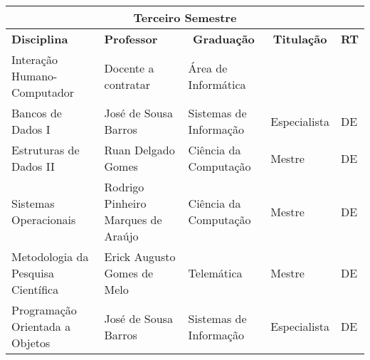 \begin{table}[h!]
\scriptsize
\begin{tabular}{lllll}
\multicolumn{5}{c}{\cellcolor[HTML]{C0C0C0}\textbf{Terceiro Semestre}}                                                                                                                                                                                                                                    \\ \hline
\multicolumn{1}{|p{5cm}|}{\cellcolor[HTML]{FFFFFF}\textbf{Disciplina}}                                    & \multicolumn{1}{p{5cm}|}{\textbf{Professor}}                 & \multicolumn{1}{c|}{\textbf{Graduação}}     & \multicolumn{1}{c|}{\textbf{Titulação}} & \multicolumn{1}{c|}{\textbf{RT}} \\ \hline
\multicolumn{1}{|l|}{Intera\c{c}\~ao Humano-Computador}                                                            & \multicolumn{1}{l|}{Docente a contratar}             & \multicolumn{1}{l|}{\'Area de Inform\'atica}          & \multicolumn{1}{l|}{}             & \multicolumn{1}{l|}{}                          \\ \hline
\multicolumn{1}{|l|}{Bancos de Dados I} & \multicolumn{1}{l|}{Jos\'e de Sousa Barros}        & \multicolumn{1}{l|}{Sistemas de Informa\c{c}\~ao}             & \multicolumn{1}{l|}{Especialista}             & \multicolumn{1}{l|}{DE}                          \\ \hline
\multicolumn{1}{|l|}{\cellcolor[HTML]{FFFFFF}Estruturas de Dados II}                         & \multicolumn{1}{l|}{Ruan Delgado Gomes}   & \multicolumn{1}{l|}{Ci\^encia da Computa\c{c}\~ao}             & \multicolumn{1}{l|}{Mestre}             & \multicolumn{1}{l|}{DE}                        \\ \hline
\multicolumn{1}{|l|}{Sistemas Operacionais}                                             & \multicolumn{1}{l|}{Rodrigo Pinheiro Marques de Ara\'ujo}                 & \multicolumn{1}{l|}{Ci\^encia da Computa\c{c}\~ao}  & \multicolumn{1}{l|}{Mestre}             & \multicolumn{1}{l|}{DE}                          \\ \hline
\multicolumn{1}{|l|}{Metodologia da Pesquisa Cient\'ifica}                                                      & \multicolumn{1}{l|}{Erick Augusto Gomes de Melo} & \multicolumn{1}{l|}{Telem\'atica}  & \multicolumn{1}{l|}{Mestre}             & \multicolumn{1}{l|}{DE}                          \\ \hline
\multicolumn{1}{|l|}{Programa\c{c}\~ao Orientada a Objetos}                                                         & \multicolumn{1}{l|}{Jos\'e de Sousa Barros}       & \multicolumn{1}{l|}{Sistemas de Informa\c{c}\~ao} & \multicolumn{1}{l|}{Especialista}       & \multicolumn{1}{l|}{DE}                        \\ \hline
\end{tabular}
\end{table}

